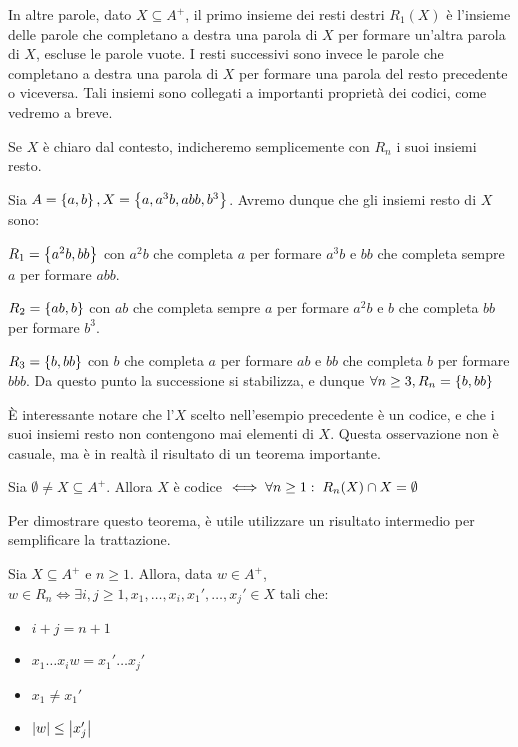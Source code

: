 In altre parole, dato \(X \subseteq A^+\), il primo insieme dei resti destri \(R_1(X)\) è l'insieme delle parole che completano a destra una parola di \(X\) per formare un'altra parola di \(X\), escluse le parole vuote.
I resti successivi sono invece le parole che completano a destra una parola di \(X\) per formare una parola del resto precedente o viceversa.
Tali insiemi sono collegati a importanti proprietà dei codici, come vedremo a breve.
\begin{note}
  Se \(X\) è chiaro dal contesto, indicheremo semplicemente con \(R_n\) i suoi insiemi resto.
\end{note}
\begin{example}
  Sia \(A = \set{a,b}, X = \set{a,a^3b,abb,b^3}\).
  Avremo dunque che gli insiemi resto di \(X\) sono:

  \(R_1 = \set{a^2b, bb}\)
  con \(a^2b\) che completa \(a\) per formare \(a^3b\) e \(bb\) che completa sempre \(a\) per formare \(abb\).

  \(R_2 = \set{ab,b}\)
  con \(ab\) che completa sempre \(a\) per formare \(a^2b\) e \(b\) che completa \(bb\) per formare \(b^3\).

  \(R_3 = \set{b,bb}\)
  con \(b\) che completa \(a\) per formare \(ab\) e \(bb\) che completa \(b\) per formare \(bbb\).
  Da questo punto la successione si stabilizza, e dunque \(\forall n \geq 3, R_n = \set{b,bb}\)
\end{example}

È interessante notare che l'\(X\) scelto nell'esempio precedente è un codice, e che i suoi insiemi resto non contengono mai elementi di \(X\).
Questa osservazione non è casuale, ma è in realtà il risultato di un teorema importante.
\begin{theorem}\label{thm:sardinas-patterson}
  Sia \(\emptyset \neq X \subseteq A^+\). Allora \(X\) è codice \(\iff \forall n\geq 1:\; R_n(X) \cap X = \emptyset\)
\end{theorem}

Per dimostrare questo teorema, è utile utilizzare un risultato intermedio per semplificare la trattazione.

\begin{lemma}\label{lem:sardinas-patterson-intermediate}
  Sia \(X \subseteq A^+\) e \(n\geq 1\). Allora, data \(w \in A^+\), \(w \in R_n \iff \exists i,j\geq 1, x_1,\ldots,x_i,x_1',\ldots,x_j' \in X\) tali che:
  \begin{itemize}
    \item \(i+j=n+1\)
    \item \(x_1\ldots x_{i}w = x_1'\ldots x_j'\)
    \item \(x_1 \neq x_1'\)
    \item \(\left|w\right| \leq \left|x_j'\right|\)
  \end{itemize}
\end{lemma}

